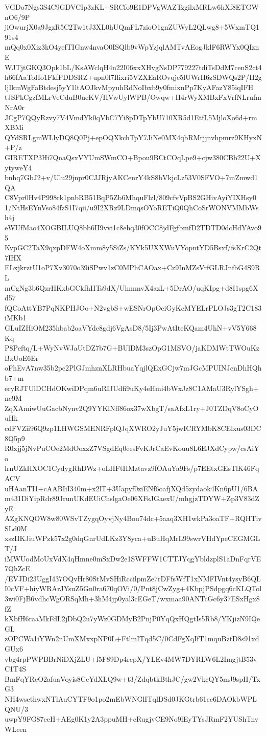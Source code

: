 VGDo7Ngs3S4C9GDVCIp3zKL+SRCfo9E1DPVgWAZTzgilxMRLw6hXf8ETGWnO6/9P
jiOwurjX0a9JgzR5C2Tw1tJ3XL0hUQmFL7zioO1gnZUWyL2QLwg8+5WxmTQ191s4
mQq0x0Xiz3kO4yefTIGnw4nvaO0ISQlb9vWpYzjqlAMTvAEogJklF6RWYx0QIznE
WJTjtGKQ3Opk1bL/KsAWclqH4n22I06xxXHvgNsDP779227tdiTsDdM7cenS2ct4
h66fAaToHo1FkfPDDSRZ+upn0l7Ilixri5VZXEaROvqje5lUWrH6zSDWQs2P/H2g
ljIkmWgFaBtdesj5yY1ltAOJkvMpyuhRdNoIbxb9y0fmixnPp7KyAFazY85iqIFH
tJSPkCgzfMLrVeCduB0ueKV/HVwUylWPB/Owqw+H4rWyXMBxFxVrfNLrufmNrA0r
JCgP7QQyRzvy7V4VmdYk0qVbC7Yi8pDTpYbU710XR5d1EtfL5MjloXo6d+rmXBMi
QYdSRLgmWLlyDQ8Q0Pj+epOQXkchTpY7JiNe0MX4qbRMrjjnvhpmrz9KHyxN+P/z
GIRETXP3Hi7QnaQsxVYUmSWmCO+Bpou9BCtCOqLpe9+cjw380CBb22U+XytyweY4
bnhq7GbJ2+v/Ulu29jnpr0CJJRjyAKCenrY4kS8bVkjcLz53V0SFVO+7mZmwd1QA
C8Vpr0Hv4P998rk1pnbRB51BqP5Zb6MhquFlzl/809cfvVpBS2GHivAyiYIXHsy0
1/NtHsEYnVso84fzS1I7qii/u9I2XRz9LDmqsOYoRETiQ0QhCoSrWONVMMbWsh4j
eWUfMao4XOGBILUQ8bb6II9vvi1c8ehq30fOCC8jdFgfbmfD2TDTD0dcHdYAvo95
KvpGC2TaX9qxpDFW4oXmm8y5SiZs/KYk5UXXWuVYopntYD5Bsxf/fsKrC2Qt7IHX
ELxjkrztU1oP7Xv3070o39iSPwv1zC0MPhCAOax+Cz9InMZsVrfGLRJnfbG4S9RL
mCgNg3b6QzrHKxbGCkfhIITs9dX/UhmmvX4azL+5DrAO/uqKIpg+d8I1spg6Xd57
fQCoAttYB7PqNKPHJOo+N2vgbS+wESNrOpOciGyKcMYELrPLOJs3gT2C183iMKb1
GLuIZHiOM235hbab2oaVYde8gdj6VgAsD8/5Ij3PwAtIteKQam4UhN+vV5Y668Kq
P8Peftq/L+WyNvWJaUtDZ7b7G+BUlDM3szOpG1MSVO/jaKDMWtTWOuKzBxUoE6Er
oFhEvA7nw35b2pc2PlGJmhznXLRHbuaYqjlQExGCjw7mJGcMPUINJcnDhHQhb7+m
eryRJTUlDCHdOKwiDPqm6uRIJUdfi9uKy4eHmi4bWxJz8C1AMaU3RylYSgh+nc9M
ZqXAmiwUuGacbNynv2Q9YYKlNff86ox37wXbgT/saAfxL1ry+J0TZDqV8oCyOuHk
cdFVZii96Q9zp1LHWGSMENRFplQJqXWRO2yJuY5jwICRYMbK8CElxus03DC8Q5p9
R0xjj5jNvPuCOe2MdOoxzZ7VSgdEq0eesFvKJrCaEvKouu8L6EJXdCypw/csAiYo
lrnUZkHXOC1CydygRhDWz+oLHFtHMztavz9fOAuYa9Fs/p7EEtxGEsTlK46FqACV
uHAanTI1+cAABIiI340m+x2lT+3Uapyf0ziENf6oafjXQd5zydaok4Kn6pU1/6BA
m431DiYipRdr89JrunUKdEUiChslgaOe06XFsJGaexU/mhgjzTDYW+Zp3V83dZyE
AZgKNQOW8w80WSvTZygqOyvjNy4Bou74dc+5aaq3XH1wkPa3oaTF+RQHTivSLd0M
xszIIKJiuWPzk57x2g0dqGnrUdLKz3Y8yca+uBuHqMrL99swrVHdYpeCEGMGLT/J
iMWUodMoUxVdX4qHmne0mSxDw2e1SWFFW1CTTJYqgYbldzplS1aDnFqrVE7QhZcE
/EVJDi23UggI437OQvHr80StMvSHiRccilpmZe7rDFfsWfT1xNMFIVnt4ysyB6QL
I0cVF+hiyWRArJYsuZ5Gn0ra670qOVi/0/Pnt8jCwZyg+4KbpjPSdpgq6cKLQTol
3wi0FjB6vdhcWgORSqMh+3hM4jp0yal3cEGeT/wxmaa90ANTcGc6y37ESxHgx8fZ
kXbfH6raaMkFdL2jDbQ2u7yWz0GDMyB2PnjP0YqQxHQgtIs5Rb8/YKjizN9IQeGL
zOPCWa1iYWn2nUmXMxxpNP0L+FtlmITqd5C/0CdFgXqIfT1mquBztD8s91xdGUx6
vbg4rpPWPBBrNiDXjZLU+f5F89Dp4rcpX/YLEv4MW7DYRLW6L2ImgjtB53vC1T4S
BmFqYReO2afuaVoyis8CcYdXLQ9w+t3/ZdqbtkBthJC/gw2VkcQY5mJ9spH/TxG3
NH4wsethwxNTlAuCYTF9o1po2mEbWNGlITqlDSd0JKGtrb61cc6DAOkbWPLQNU/3
uwpY9FG87eeH+AEg0K1y2A3ppuMH+cRugjvCE9No9lEyTYsJRmF2YUShTnvWLcen
